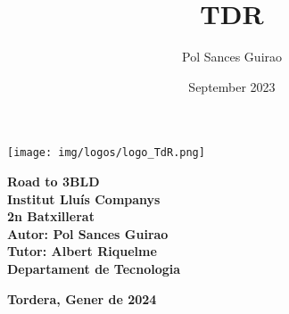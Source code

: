 \documentclass[11pt,oneside]{book}
\title{TDR}
\author{Pol Sances Guirao}
\date{September 2023}
\begin{document}
\frontmatter


\begin{titlepage}
    \centering
    \vspace*{\fill}
    
    \begin{minipage}{0.4\textwidth}
        \texttt{[image: img/logos/logo\_TdR.png]}
    \end{minipage}
    \hfill
    \begin{minipage}{0.5\textwidth}
        \begin{center}
            \textbf{\Huge Road to 3BLD}\\
            \vspace{0.5cm}
            \textbf{\LARGE Institut Lluís Companys}\\
            \vspace{0.5cm}
            \textbf{\Large 2n Batxillerat}\\
            \vspace{0.5cm}
            \textbf{\large Autor: Pol Sances Guirao}\\
            \vspace{0.5cm}
            \textbf{\large Tutor: Albert Riquelme}\\
            \vspace{0.5cm}
            \textbf{\large Departament de Tecnologia}
        \end{center}
    \end{minipage}

    \vfill
    \vspace*{\fill}
    \textbf{Tordera, Gener de 2024}
\end{titlepage}



\newpage



\newpage
\pagestyle{index}
\tableofcontents

\newpage


\newpage


\mainmatter

\newpage


\newpage






\newpage


\newpage

\newpage


\newpage



\backmatter
\newpage


\newpage
{}
\pagestyle{plain}
\printbibliography
\nocite{*}
\end{document}
